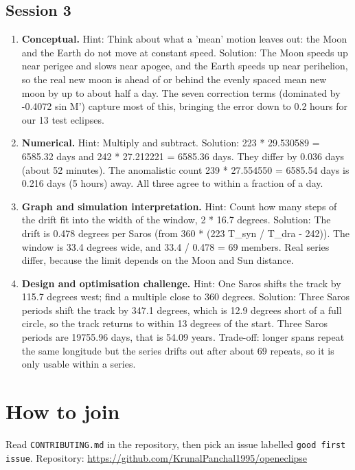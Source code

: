 \documentclass[11pt,a4paper]{article}
\begin{document}
\subsection*{Session 3}
\begin{enumerate}[nosep]
\item \textbf{Conceptual.} Hint: Think about what a 'mean' motion leaves out: the Moon and the Earth do not move at constant speed. Solution: The Moon speeds up near perigee and slows near apogee, and the Earth speeds up near perihelion, so the real new moon is ahead of or behind the evenly spaced mean new moon by up to about half a day. The seven correction terms (dominated by -0.4072 sin M') capture most of this, bringing the error down to 0.2 hours for our 13 test eclipses.
\item \textbf{Numerical.} Hint: Multiply and subtract. Solution: 223 * 29.530589 = 6585.32 days and 242 * 27.212221 = 6585.36 days. They differ by 0.036 days (about 52 minutes). The anomalistic count 239 * 27.554550 = 6585.54 days is 0.216 days (5 hours) away. All three agree to within a fraction of a day.
\item \textbf{Graph and simulation interpretation.} Hint: Count how many steps of the drift fit into the width of the window, 2 * 16.7 degrees. Solution: The drift is 0.478 degrees per Saros (from 360 * (223 T\_syn / T\_dra - 242)). The window is 33.4 degrees wide, and 33.4 / 0.478 = 69 members. Real series differ, because the limit depends on the Moon and Sun distance.
\item \textbf{Design and optimisation challenge.} Hint: One Saros shifts the track by 115.7 degrees west; find a multiple close to 360 degrees. Solution: Three Saros periods shift the track by 347.1 degrees, which is 12.9 degrees short of a full circle, so the track returns to within 13 degrees of the start. Three Saros periods are 19755.96 days, that is 54.09 years. Trade-off: longer spans repeat the same longitude but the series drifts out after about 69 repeats, so it is only usable within a series.
\end{enumerate}

\section{How to join}
Read \texttt{CONTRIBUTING.md} in the repository, then pick an issue labelled \texttt{good first issue}. Repository: \url{https://github.com/KrunalPanchal1995/openeclipse}
\end{document}
